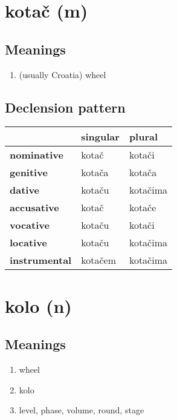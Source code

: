 \filbreak
\section{kotač (m)}
\subsection*{Meanings}
\begin{enumerate}
\item (usually Croatia) wheel
\end{enumerate}
\subsection*{Declension pattern}
\begin{tabularx}{\linewidth}{Xll}
\toprule
{} & singular &    plural \\
\midrule
\textbf{nominative  } &    kotač &    kotači \\
\textbf{genitive    } &   kotača &    kotača \\
\textbf{dative      } &   kotaču &  kotačima \\
\textbf{accusative  } &    kotač &    kotače \\
\textbf{vocative    } &   kotaču &    kotači \\
\textbf{locative    } &   kotaču &  kotačima \\
\textbf{instrumental} &  kotačem &  kotačima \\
\bottomrule
\end{tabularx}

\filbreak
\section{kolo (n)}
\subsection*{Meanings}
\begin{enumerate}
\item wheel
\item kolo
\item level, phase, volume, round, stage
\end{enumerate}
